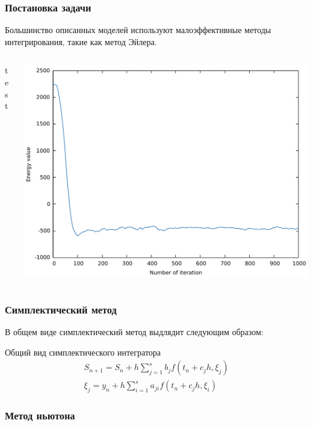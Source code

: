 \documentclass[t]{beamer}
\begin{document}
\begin{frame}
    \frametitle{Постановка задачи}

    Большинство описанных моделей используют малоэффективные методы
    интегрирования, такие как метод Эйлера.


    \begin{columns}
        \begin{column}{0.3\textwidth}
            test
        \end{column}
        \begin{column}{0.7\textwidth}
            \vspace{4em}
            \centering
            \includegraphics[scale=0.3]{energy_loss_euler_1}
        \end{column}
    \end{columns}

\end{frame}

\begin{frame}
    \frametitle{Симплектический метод}
    В общем виде симплектический метод выдлядит следующим образом:

    \begin{block}{Общий вид симплектического интегратора}
        \begin{gather*}
            S_{n+1} = S_n + h\sum_{j=1}^s b_j f(t_n+c_jh, \xi_j)
            \\
            \xi_j = y_n + h\sum_{i=1}^{s}a_{ji} f(t_n+c_jh, \xi_i)
        \end{gather*}
    \end{block}
\end{frame}

\begin{frame}
    \frametitle{Метод ньютона}

\end{frame}
\end{document}
